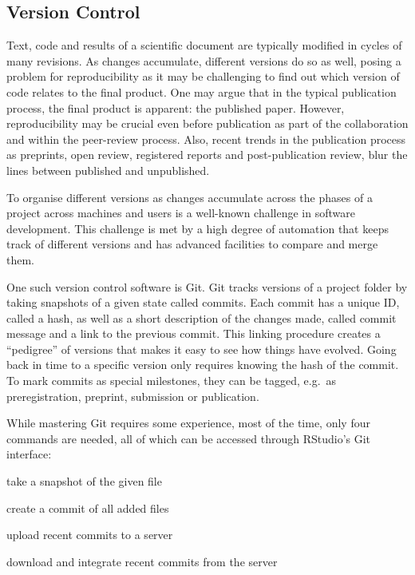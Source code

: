 \documentclass[12pt,a4paper,twoside]{article}
\providecommand{\tightlist}{%
  \setlength{\itemsep}{0pt}\setlength{\parskip}{0pt}}
\begin{document}
\hypertarget{version-control}{%
\subsection{Version Control}\label{version-control}}

Text, code and results of a scientific document are typically modified in cycles of many revisions.
As changes accumulate, different versions do so as well, posing a problem for reproducibility as it may be challenging to find out which version of code relates to the final product.
One may argue that in the typical publication process, the final product is apparent: the published paper.
However, reproducibility may be crucial even before publication as part of the collaboration and within the peer-review process.
Also, recent trends in the publication process as preprints, open review, registered reports and post-publication review, blur the lines between published and unpublished.

To organise different versions as changes accumulate across the phases of a project across machines and users is a well-known challenge in software development.
This challenge is met by a high degree of automation that keeps track of different versions and has advanced facilities to compare and merge them.

One such version control software is Git. Git tracks versions of a project folder by taking snapshots of a given state called commits.
Each commit has a unique ID, called a hash, as well as a short description of the changes made, called commit message and a link to the previous commit.
This linking procedure creates a ``pedigree'' of versions that makes it easy to see how things have evolved.
Going back in time to a specific version only requires knowing the hash of the commit.
To mark commits as special milestones, they can be tagged, e.g.~as preregistration, preprint, submission or publication.

While mastering Git requires some experience, most of the time, only four commands are needed, all of which can be accessed through RStudio's Git interface:

\begin{description}
\tightlist
\item[git add]
take a snapshot of the given file
\item[git commit]
create a commit of all added files
\item[git push]
upload recent commits to a server
\item[git pull]
download and integrate recent commits from the server
\end{description}
\end{document}
